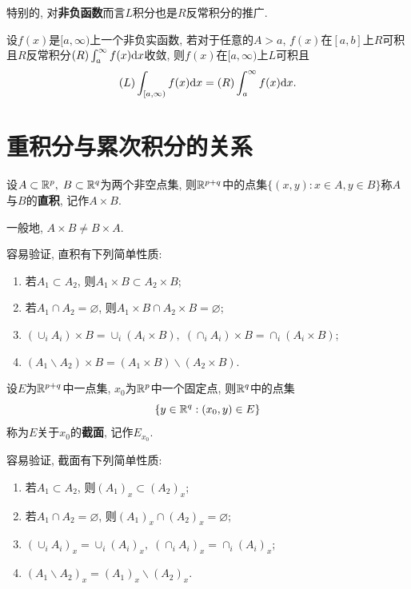 \vskip 0.3cm
特别的, 对\textbf{非负函数}而言$L$积分也是$R$反常积分的推广.  
\begin{theorem}
	设$f(x)$是$[a,\infty)$上一个非负实函数, 若对于任意的$A > a$, $f(x)$在$[a,b]$上$R$可积且$R$反常积分$(R) \int_a^{\infty} f(x) \mathrm{d} x$收敛, 则$f(x)$在$[a,\infty)$上$L$可积且
	$$
		(L) \int_{[a,\infty)} f(x) \mathrm{d} x = (R) \int_a^{\infty} f(x) \mathrm{d} x.
	$$
\end{theorem}



 





%
%
\section{重积分与累次积分的关系}

\begin{definition}[直积]
	设$A \subset \mathbb{R}^p, \; B \subset \mathbb{R}^q$为两个非空点集, 则$\mathbb{R}^{p+q}$中的点集$\{ (x,y): x \in A, y \in B \}$称$A$与$B$的\textbf{直积}, 记作$A \times B$.
\end{definition}
\begin{note}
	一般地, $A \times B \neq B \times A$. 
\end{note} 

容易验证, 直积有下列简单性质: 
\begin{enumerate}
	\item 若$A_1 \subset A_2$, 则$A_1 \times B \subset A_2 \times B$; 
	\item 若$A_1 \cap A_2 = \varnothing$, 则$A_1 \times B \cap A_2 \times B = \varnothing$; 
	\item $(\cup_i A_i) \times B = \cup_i (A_i \times B), \; (\cap_i A_i) \times B = \cap_i (A_i \times B)$; 
	\item $(A_1 \backslash A_2) \times B = (A_1 \times B) \backslash (A_2 \times B)$. 
\end{enumerate}

\begin{definition}[截面]
	设$E$为$\mathbb{R}^{p+q}$中一点集, $x_0$为$\mathbb{R}^p$中一个固定点, 则$\mathbb{R}^q$中的点集
	$$
		\{ y \in \mathbb{R}^q: (x_0, y) \in E \}
	$$
	称为$E$关于$x_0$的\textbf{截面}, 记作$E_{x_0}$.
\end{definition}

容易验证, 截面有下列简单性质: 
\begin{enumerate}
	\item 若$A_1 \subset A_2$, 则$(A_1)_x \subset (A_2)_x$; 
	\item 若$A_1 \cap A_2 = \varnothing$, 则$(A_1)_x \cap (A_2)_x = \varnothing$; 
	\item $(\cup_i A_i)_x = \cup_i (A_i)_x, \; (\cap_i A_i)_x = \cap_i (A_i)_x$; 
	\item $(A_1 \backslash A_2)_x = (A_1)_x \backslash (A_2)_x$. 
\end{enumerate}

